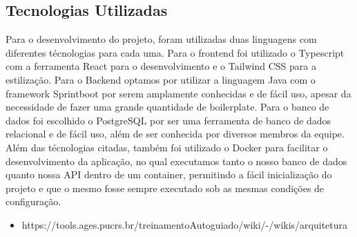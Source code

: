 \subsection{Tecnologias Utilizadas}
  Para o desenvolvimento do projeto, foram utilizadas duas linguagens com diferentes técnologias para cada uma. Para o frontend foi utilizado o Typescript com a ferramenta React para o desenvolvimento e o Tailwind CSS para a estilização. Para o Backend optamos por utilizar a linguagem Java com o framework Sprintboot por serem amplamente conhecidas e de fácil uso, apesar da necessidade de fazer uma grande quantidade de boilerplate. Para o banco de dados foi escolhido o PostgreSQL por ser uma ferramenta de banco de dados relacional e de fácil uso, além de ser conhecida por diversos membros da equipe. Além das técnologias citadas, também foi utilizado o Docker para facilitar o desenvolvimento da aplicação, no qual executamos tanto o nosso banco de dados quanto nossa API dentro de um container, permitindo a fácil inicialização do projeto e que o mesmo fosse sempre executado sob as mesmas condições de configuração.

    \begin{itemize}
      \item https://tools.ages.pucrs.br/treinamentoAutoguiado/wiki/-/wikis/arquitetura
    \end{itemize}
